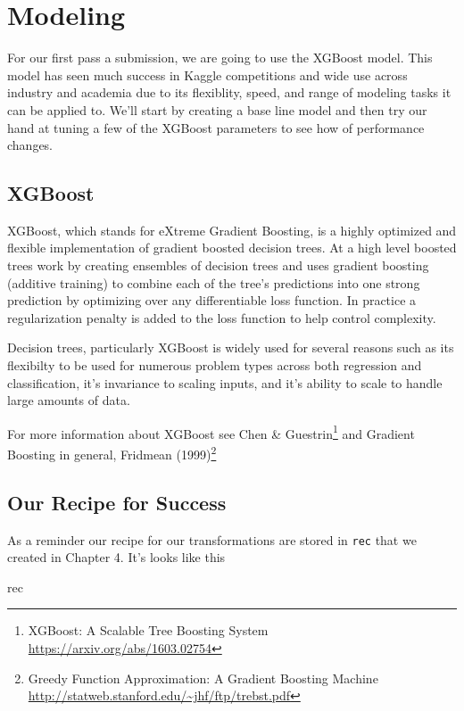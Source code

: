 \documentclass[]{book}
\newenvironment{Shaded}{\begin{snugshade}}{\end{snugshade}}
\newcommand{\NormalTok}[1]{#1}
\let\rmarkdownfootnote\footnote%
\def\footnote{\protect\rmarkdownfootnote}
\theoremstyle{definition}
\theoremstyle{definition}
\theoremstyle{definition}
\theoremstyle{remark}
\begin{document}
\chapter{Modeling}\label{modeling}

For our first pass a submission, we are going to use the XGBoost model.
This model has seen much success in Kaggle competitions and wide use
across industry and academia due to its flexiblity, speed, and range of
modeling tasks it can be applied to. We'll start by creating a base line
model and then try our hand at tuning a few of the XGBoost parameters to
see how of performance changes.

\section{XGBoost}\label{xgboost}

XGBoost, which stands for eXtreme Gradient Boosting, is a highly
optimized and flexible implementation of gradient boosted decision
trees. At a high level boosted trees work by creating ensembles of
decision trees and uses gradient boosting (additive training) to combine
each of the tree's predictions into one strong prediction by optimizing
over any differentiable loss function. In practice a regularization
penalty is added to the loss function to help control complexity.

Decision trees, particularly XGBoost is widely used for several reasons
such as its flexibilty to be used for numerous problem types across both
regression and classification, it's invariance to scaling inputs, and
it's ability to scale to handle large amounts of data.

For more information about XGBoost see Chen \& Guestrin\footnote{XGBoost:
  A Scalable Tree Boosting System \url{https://arxiv.org/abs/1603.02754}}
and Gradient Boosting in general, Fridmean (1999)\footnote{Greedy
  Function Approximation: A Gradient Boosting Machine
  \url{http://statweb.stanford.edu/~jhf/ftp/trebst.pdf}}

\section{Our Recipe for Success}\label{our-recipe-for-success}

As a reminder our recipe for our transformations are stored in
\texttt{rec} that we created in Chapter 4. It's looks like this

\begin{Shaded}
\begin{Highlighting}[]
\NormalTok{rec}
\end{Highlighting}
\end{Shaded}
\end{document}
